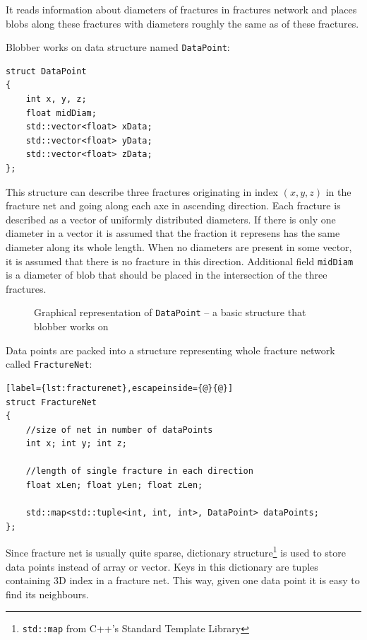 It reads information about diameters of fractures in fractures network
and places blobs along these fractures with diameters roughly the same as of
these fractures.

Blobber works on data structure named \texttt{DataPoint}:

\begin{lstlisting}
struct DataPoint
{
  	int x, y, z;
	float midDiam;
	std::vector<float> xData;
	std::vector<float> yData;
	std::vector<float> zData;
};
\end{lstlisting}

This structure can describe three fractures originating in index $(x,y,z)$ in
the fracture net and going along each axe in ascending direction. Each fracture
is described as a vector of uniformly distributed diameters. If there is only
one diameter in a vector it is assumed that the fraction it represens has the
same diameter along its whole length. When no diameters are present in some
vector, it is assumed that there is no fracture in this direction.
Additional field \texttt{midDiam} is a diameter of blob that should be placed in
the intersection of the three fractures.

\begin{figure}[hb]
  \begin{center}
    
  \end{center}
  \caption{Graphical representation of \texttt{DataPoint} -- a basic structure that
blobber works on}
  \label{fig:datapoint}
\end{figure}

Data points are packed into a structure representing whole fracture network
called \texttt{FractureNet}:
\begin{lstlisting}[label={lst:fracturenet},escapeinside={@}{@}]
struct FractureNet
{
	//size of net in number of dataPoints
	int x; int y; int z;
	
	//length of single fracture in each direction
	float xLen; float yLen; float zLen;
	
	std::map<std::tuple<int, int, int>, DataPoint> dataPoints;
};
\end{lstlisting}

Since fracture net is usually quite sparse, dictionary structure\footnote{\texttt{std::map} from C++'s Standard Template Library}
is used to store data points instead of array or vector. Keys in this dictionary
are tuples containing 3D index in a fracture net. This way, given one data point
it is easy to find its neighbours.

